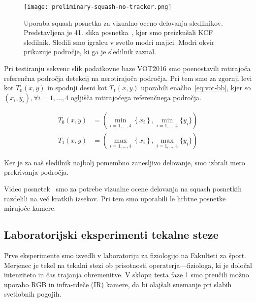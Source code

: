 \begin{figure}[htbp]
	\centering
	\texttt{[image: preliminary-squash-no-tracker.png]}
	\caption[Uporaba squash posnetka za vizualno oceno delovanja sledilnikov]{Uporaba squash posnetka za vizualno oceno delovanja sledilnikov. Predstavljena je 41. slika posnetka~\cite{squashtv2014squash}, kjer smo preizkušali KCF sledilnik. Sledili smo igralcu v svetlo modri majici. Modri okvir prikazuje področje, ki ga je sledilnik zaznal.}
	\label{fig:testiranje-squash-1-kcf}
\end{figure}



Pri testiranju sekvenc slik podatkovne baze VOT2016 smo poenostavili rotirajoča referenčna področja detekcij na nerotirajoča področja. Pri tem smo za zgornji levi kot $T_0(x,y)$ in spodnji desni kot $T_1(x,y)$ uporabili enačbo~\eqref{eq:vot-bb}, kjer so $\left( x_i, y_i\right), \forall i=1,\ldots,4$ ogljišča rotirajočega referenčnega področja. 

\begin{equation}
\begin{aligned}
T_0(x,y) &= \left( \min_{i = 1,\ldots,4}\left\{x_i \right\}, 
\min_{i=1,\ldots,4}\{y_i \} \right) \\
T_1(x,y) &= \left( \max_{i = 1,\ldots,4}\left\{x_i \right\}, 
\max_{i=1,\ldots,4}\{y_i \} \right)
\end{aligned}
\label{eq:vot-bb}
\end{equation}

Ker je za naš sledilnik najbolj pomembno zanesljivo delovanje, smo izbrali mero prekrivanja področja.


Video posnetek~\cite{squashtv2014squash} smo za potrebe vizualne ocene delovanja na squash posnetkih razdelili na več kratkih izsekov. Pri tem smo uporabili le hrbtne posnetke mirujoče kamere. 







\subsection{Laboratorijski eksperimenti tekalne steze}
Prve eksperimente smo izvedli v laboratoriju za fiziologijo na Fakulteti za šport. Merjenec je tekel na tekalni stezi ob prisotnosti operaterja---fiziologa, ki je določal intenziteto in čas trajanja obremenitve. V sklopu testa faze 1 smo preučili možno uporabo RGB in infra-rdeče (IR) kamere, da bi olajšali snemanje pri slabih svetlobnih pogojih.


